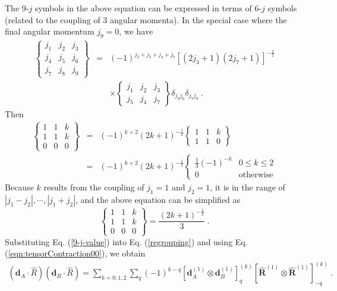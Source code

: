 The 9-$j$ symbols in the above equation can be expressed in terms of 6-$j$ symbols (related to the coupling of 3 angular momenta). In the special case where the final angular momentum $j_{9}=0$, we have
\begin{eqnarray}
\left\{
\begin{array}{ccc}
j_{1}& j_{2}&j_{3} \\
j_{4}&j_{5}&j_{6} \\
j_{7}&j_{8}&j_{9}
\end{array}
\right\} 
&=&(-1)^{j_{2} + j_{3} + j_{4} + j_{7}}[(2j_{3} +1)(2j_{7} + 1)]^{-\frac{1}{2}} \nonumber \\
&  & \times 
\left\{
\begin{array}{ccc}
j_{1}& j_{2}&j_{3} \\
j_{5}&j_{4}&j_{7} 
\end{array}
\right\} 
\delta_{j_{3}j_{6}}\delta_{j_{7}j_{8}} \ . 
\end{eqnarray}
Then
\begin{eqnarray}
\left\{
\begin{array}{ccc}
1& 1&k \\
1&1&k \\
0&0&0 
\end{array}
\right\} 
&=& (-1)^{k+2} (2k+1)^{-\frac{1}{2}}
\left\{
\begin{array}{ccc}
1& 1&k \\
1&1&0 
\end{array}
\right\} \nonumber \\
&=& (-1)^{k+2} (2k+1)^{-\frac{1}{2}} 
\left\{ 
\begin{array}{cc}
\frac{1}{3} (-1)^{-k} & 0\leq k \leq 2 \\
0 & \mbox{otherwise}
\end{array}
\right.
\end{eqnarray}
Because $k$ results from the coupling of $j_{1}=1$ and $j_{2}=1$, it is in the range of $|j_{1}-j_{2}|, \cdots, |j_{1}+j_{2}|$, and the above equation can be simplified as
\begin{equation}
\left\{
\begin{array}{ccc}
1& 1&k \\
1&1&k \\
0&0&0 
\end{array}
\right\} = \frac{(2k + 1)^{-\frac{1}{2}}}{3} \ . \label{9-j-value}
\end{equation}  
Substituting Eq. (\ref{9-j-value}) into Eq. (\ref{regrouping}) and using Eq. (\ref{eqn:tensorContraction00}), we obtain
\begin{eqnarray}
(\mathbf{d}_{A}\cdot\hat{R})(\mathbf{d}_{B}\cdot\hat{R})
= \sum_{k=0,1,2}\sum_{q} (-1)^{k-q} \left[ \mathbf{d}_{A}^{(1)} \otimes \mathbf{d}_{B}^{(1)} \right]^{(k)}_{q} \left[ \mathbf{\hat{R}}^{(1)} \otimes \mathbf{\hat{R}}^{(1)} \right]^{(k)}_{-q} \ . \label{scalarXscalar}
\end{eqnarray}
